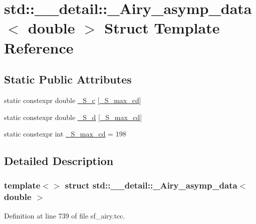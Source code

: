 \hypertarget{structstd_1_1____detail_1_1__Airy__asymp__data_3_01double_01_4}{}\section{std\+:\+:\+\_\+\+\_\+detail\+:\+:\+\_\+\+Airy\+\_\+asymp\+\_\+data$<$ double $>$ Struct Template Reference}
\label{structstd_1_1____detail_1_1__Airy__asymp__data_3_01double_01_4}
\subsection*{Static Public Attributes}
\begin{DoxyCompactItemize}
\item 
static constexpr double \hyperlink{structstd_1_1____detail_1_1__Airy__asymp__data_3_01double_01_4_a38e855b175c89166c4220cacd07ca1c7}{\+\_\+\+S\+\_\+c} \mbox{[}\hyperlink{structstd_1_1____detail_1_1__Airy__asymp__data_3_01double_01_4_a38e485184d2762e83a27937efc343d01}{\+\_\+\+S\+\_\+max\+\_\+cd}\mbox{]}
\item 
static constexpr double \hyperlink{structstd_1_1____detail_1_1__Airy__asymp__data_3_01double_01_4_aeaf6aab79b67a46932e9d16864ad0f78}{\+\_\+\+S\+\_\+d} \mbox{[}\hyperlink{structstd_1_1____detail_1_1__Airy__asymp__data_3_01double_01_4_a38e485184d2762e83a27937efc343d01}{\+\_\+\+S\+\_\+max\+\_\+cd}\mbox{]}
\item 
static constexpr int \hyperlink{structstd_1_1____detail_1_1__Airy__asymp__data_3_01double_01_4_a38e485184d2762e83a27937efc343d01}{\+\_\+\+S\+\_\+max\+\_\+cd} = 198
\end{DoxyCompactItemize}


\subsection{Detailed Description}
\subsubsection*{template$<$$>$\newline
struct std\+::\+\_\+\+\_\+detail\+::\+\_\+\+Airy\+\_\+asymp\+\_\+data$<$ double $>$}



Definition at line 739 of file sf\+\_\+airy.\+tcc.



